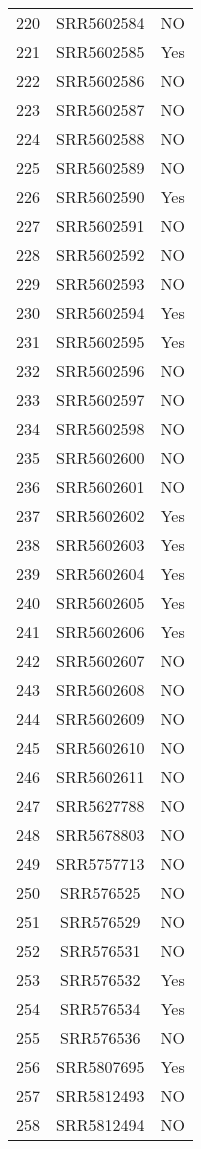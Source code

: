 \begin{longtable}{ccc}
  220 & SRR5602584 & NO \\ 
  221 & SRR5602585 & Yes \\ 
  222 & SRR5602586 & NO \\ 
  223 & SRR5602587 & NO \\ 
  224 & SRR5602588 & NO \\ 
  225 & SRR5602589 & NO \\ 
  226 & SRR5602590 & Yes \\ 
  227 & SRR5602591 & NO \\ 
  228 & SRR5602592 & NO \\ 
  229 & SRR5602593 & NO \\ 
  230 & SRR5602594 & Yes \\ 
  231 & SRR5602595 & Yes \\ 
  232 & SRR5602596 & NO \\ 
  233 & SRR5602597 & NO \\ 
  234 & SRR5602598 & NO \\ 
  235 & SRR5602600 & NO \\ 
  236 & SRR5602601 & NO \\ 
  237 & SRR5602602 & Yes \\ 
  238 & SRR5602603 & Yes \\ 
  239 & SRR5602604 & Yes \\ 
  240 & SRR5602605 & Yes \\ 
  241 & SRR5602606 & Yes \\ 
  242 & SRR5602607 & NO \\ 
  243 & SRR5602608 & NO \\ 
  244 & SRR5602609 & NO \\ 
  245 & SRR5602610 & NO \\ 
  246 & SRR5602611 & NO \\ 
  247 & SRR5627788 & NO \\ 
  248 & SRR5678803 & NO \\ 
  249 & SRR5757713 & NO \\ 
  250 & SRR576525 & NO \\ 
  251 & SRR576529 & NO \\ 
  252 & SRR576531 & NO \\ 
  253 & SRR576532 & Yes \\ 
  254 & SRR576534 & Yes \\ 
  255 & SRR576536 & NO \\ 
  256 & SRR5807695 & Yes \\ 
  257 & SRR5812493 & NO \\ 
  258 & SRR5812494 & NO \\ 

\end{longtable}
